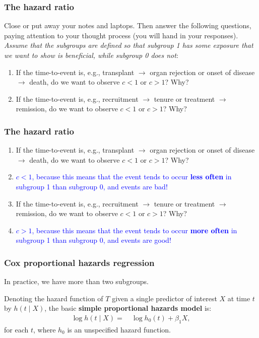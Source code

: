 \documentclass[12pt, 
hyperref={colorlinks=true, linkcolor=blue, urlcolor=cyan},dvipsnames]{beamer}
\begin{document}
\begin{frame}
\frametitle{The hazard ratio}
Close or put away your notes and laptops. Then answer the following questions, paying attention to your thought process (you will hand in your responses). \textit{Assume that the subgroups are defined so that subgroup 1 has some exposure that we want to show is beneficial, while subgroup 0 does not}:

\begin{enumerate}
\item If the time-to-event is, e.g., transplant $\rightarrow$ organ rejection or onset of disease $\rightarrow$ death, do we want to observe $c < 1$ or $c > 1$? Why?
\item If the time-to-event is, e.g., recruitment $\rightarrow$ tenure or treatment $\rightarrow$ remission, do we want to observe $c < 1$ or $c > 1$? Why?
\end{enumerate}
\end{frame}

\begin{frame}
\frametitle{The hazard ratio}
\begin{enumerate}
\item If the time-to-event is, e.g., transplant $\rightarrow$ organ rejection or onset of disease $\rightarrow$ death, do we want to observe $c < 1$ or $c > 1$? Why?
\item[] \textcolor{blue}{$c < 1$, because this means that the event tends to occur \textbf{less often} in subgroup 1 than subgroup 0, and events are bad!}
\item If the time-to-event is, e.g., recruitment $\rightarrow$ tenure or treatment $\rightarrow$ remission, do we want to observe $c < 1$ or $c > 1$? Why?
\item[] \textcolor{blue}{$c > 1$, because this means that the event tends to occur \textbf{more often} in subgroup 1 than subgroup 0, and events are good!}
\end{enumerate}
\end{frame}

\begin{frame}
\frametitle{Cox proportional hazards regression}
In practice, we have more than two subgroups. 

Denoting the hazard function of $T$ given a single predictor of interest $X$ at time $t$ by $h(t \mid X)$, the basic \textbf{simple proportional hazards model} is:
\begin{align*}
\log h(t \mid X) = & \ \log h_0(t) + \beta_1 X,
\end{align*}
for each $t$, where $h_0$ is an unspecified hazard function.

\end{frame}
\end{document}
